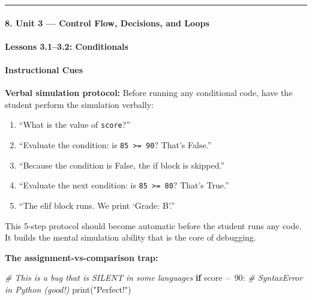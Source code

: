 \documentclass[
  justified,
  openright,
]{tufte-book}
\let\subsection\paragraph
\let\paragraph\paragraph
\newcommand{\KeywordTok}[1]{\textcolor{CodeKeyword}{\textbf{#1}}}  %
\newcommand{\StringTok}[1]{\textcolor{CodeString}{#1}}              %
\newcommand{\CommentTok}[1]{\textcolor{CodeComment}{\textit{#1}}}  %
\newcommand{\CodeNumTok}[1]{\textcolor{CodeNumber}{#1}}             %
\newcommand{\OperatorTok}[1]{\textcolor{DarkGray}{#1}}              %
\newenvironment{Shaded}{%
  \begin{mdframed}[style=TufteCode]%
}{%
  \end{mdframed}%
}
\let\subsection\paragraph
\let\paragraph\paragraph
\providecommand{\tightlist}{%
  \setlength{\itemsep}{0pt}\setlength{\parskip}{0pt}}
\begin{document}
\begin{center}\rule{0.5\linewidth}{0.5pt}\end{center}

\subsection{8. Unit 3 --- Control Flow, Decisions, and
Loops}\label{unit-3-control-flow-decisions-and-loops}

\subsection{Lessons 3.1--3.2:
Conditionals}\label{lessons-3.13.2-conditionals}

\paragraph{Instructional Cues}\label{instructional-cues-7}

\textbf{Verbal simulation protocol:} Before running any conditional
code, have the student perform the simulation verbally:

\begin{enumerate}
\def\labelenumi{\arabic{enumi}.}
\tightlist
\item
  ``What is the value of \texttt{score}?''
\item
  ``Evaluate the condition: is \texttt{85\ \textgreater{}=\ 90}? That's
  False.''
\item
  ``Because the condition is False, the if block is skipped.''
\item
  ``Evaluate the next condition: is \texttt{85\ \textgreater{}=\ 80}?
  That's True.''
\item
  ``The elif block runs. We print `Grade: B'.''
\end{enumerate}

This 5-step protocol should become automatic before the student runs any
code. It builds the mental simulation ability that is the core of
debugging.

\textbf{The assignment-vs-comparison trap:}

\begin{Shaded}
\begin{Highlighting}[]
\CommentTok{\# This is a bug that is SILENT in some languages}
\KeywordTok{if} score \OperatorTok{=} \CodeNumTok{90}:   \CommentTok{\# SyntaxError in Python (good!)}
    print(\StringTok{"Perfect!"})
\end{Highlighting}
\end{Shaded}
\end{document}
